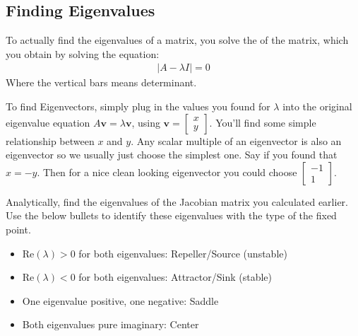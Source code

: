 \documentclass[letterpaper,10pt,english]{jupyterBook}
\begin{document}
\subsection{Finding Eigenvalues}
\label{\detokenize{content/1_mechanics/dynamical_2:finding-eigenvalues}}
\sphinxAtStartPar
To actually find the eigenvalues of a matrix, you solve the  of the matrix, which you obtain by solving the equation:
\begin{equation*}
\begin{split}
|A - \lambda I | = 0 
\end{split}
\end{equation*}
\sphinxAtStartPar
Where the vertical bars means determinant.

\sphinxAtStartPar
To find Eigenvectors, simply plug in the values you found for \(\lambda\) into the original eigenvalue equation \(A\mathbf{v} = \lambda \mathbf{v}\), using \(\mathbf{v} = \begin{bmatrix}x \\ y\end{bmatrix}\). You’ll find some simple relationship between \(x\) and \(y\). Any scalar multiple of an eigenvector is also an eigenvector so we usually just choose the simplest one. Say if you found that \(x = -y\). Then for a nice clean looking eigenvector you could choose \(\begin{bmatrix} -1 \\ 1\end{bmatrix}\).

\sphinxAtStartPar
{}

\sphinxAtStartPar
Analytically, find the eigenvalues of the Jacobian matrix you calculated earlier. Use the below bullets to identify these eigenvalues with the type of the fixed point.
\begin{itemize}
\item {} 
\sphinxAtStartPar
\(\mathrm{Re}(\lambda) > 0 \) for both eigenvalues: Repeller/Source (unstable)

\item {} 
\sphinxAtStartPar
\(\mathrm{Re}(\lambda) < 0 \) for both eigenvalues: Attractor/Sink  (stable)

\item {} 
\sphinxAtStartPar
One eigenvalue positive, one negative: Saddle

\item {} 
\sphinxAtStartPar
Both eigenvalues pure imaginary: Center

\end{itemize}
\end{document}
